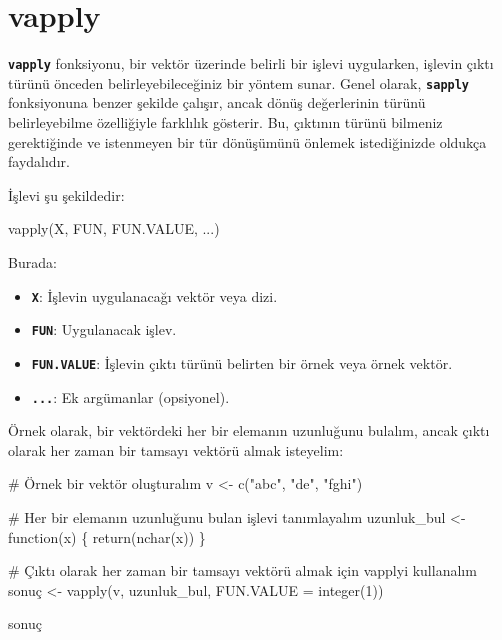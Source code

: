\documentclass[
  letterpaper,
  DIV=11,
  numbers=noendperiod]{scrreprt}
\newenvironment{Shaded}{\begin{snugshade}}{\end{snugshade}}
\newcommand{\AttributeTok}[1]{\textcolor[rgb]{0.40,0.45,0.13}{#1}}
\newcommand{\CommentTok}[1]{\textcolor[rgb]{0.37,0.37,0.37}{#1}}
\newcommand{\ControlFlowTok}[1]{\textcolor[rgb]{0.00,0.23,0.31}{#1}}
\newcommand{\DecValTok}[1]{\textcolor[rgb]{0.68,0.00,0.00}{#1}}
\newcommand{\FunctionTok}[1]{\textcolor[rgb]{0.28,0.35,0.67}{#1}}
\newcommand{\NormalTok}[1]{\textcolor[rgb]{0.00,0.23,0.31}{#1}}
\newcommand{\OtherTok}[1]{\textcolor[rgb]{0.00,0.23,0.31}{#1}}
\newcommand{\StringTok}[1]{\textcolor[rgb]{0.13,0.47,0.30}{#1}}
\begin{document}
\section{vapply}\label{vapply}

\textbf{\texttt{vapply}} fonksiyonu, bir vektör üzerinde belirli bir
işlevi uygularken, işlevin çıktı türünü önceden belirleyebileceğiniz bir
yöntem sunar. Genel olarak, \textbf{\texttt{sapply}} fonksiyonuna benzer
şekilde çalışır, ancak dönüş değerlerinin türünü belirleyebilme
özelliğiyle farklılık gösterir. Bu, çıktının türünü bilmeniz
gerektiğinde ve istenmeyen bir tür dönüşümünü önlemek istediğinizde
oldukça faydalıdır.

İşlevi şu şekildedir:

\begin{Shaded}
\begin{Highlighting}[]
\FunctionTok{vapply}\NormalTok{(X, FUN, FUN.VALUE, ...)}
\end{Highlighting}
\end{Shaded}

Burada:

\begin{itemize}
\item
  \textbf{\texttt{X}}: İşlevin uygulanacağı vektör veya dizi.
\item
  \textbf{\texttt{FUN}}: Uygulanacak işlev.
\item
  \textbf{\texttt{FUN.VALUE}}: İşlevin çıktı türünü belirten bir örnek
  veya örnek vektör.
\item
  \textbf{\texttt{...}}: Ek argümanlar (opsiyonel).
\end{itemize}

Örnek olarak, bir vektördeki her bir elemanın uzunluğunu bulalım, ancak
çıktı olarak her zaman bir tamsayı vektörü almak isteyelim:

\begin{Shaded}
\begin{Highlighting}[]
\CommentTok{\# Örnek bir vektör oluşturalım}
\NormalTok{v }\OtherTok{\textless{}{-}} \FunctionTok{c}\NormalTok{(}\StringTok{"abc"}\NormalTok{, }\StringTok{"de"}\NormalTok{, }\StringTok{"fghi"}\NormalTok{)}

\CommentTok{\# Her bir elemanın uzunluğunu bulan işlevi tanımlayalım}
\NormalTok{uzunluk\_bul }\OtherTok{\textless{}{-}} \ControlFlowTok{function}\NormalTok{(x) \{}
  \FunctionTok{return}\NormalTok{(}\FunctionTok{nchar}\NormalTok{(x))}
\NormalTok{\}}

\CommentTok{\# Çıktı olarak her zaman bir tamsayı vektörü almak için vapply\textquotesingle{}i kullanalım}
\NormalTok{sonuç }\OtherTok{\textless{}{-}} \FunctionTok{vapply}\NormalTok{(v, uzunluk\_bul, }\AttributeTok{FUN.VALUE =} \FunctionTok{integer}\NormalTok{(}\DecValTok{1}\NormalTok{))}

\NormalTok{sonuç}
\end{Highlighting}
\end{Shaded}
\end{document}
